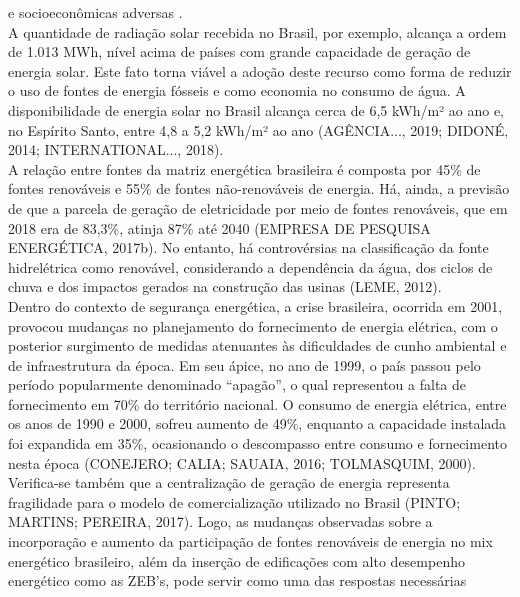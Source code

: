      e socioeconômicas adversas \cite{Pikas2014,Pikas2017}.\\
     A quantidade de radiação solar recebida no Brasil, por exemplo, alcança a ordem de 1.013 MWh, 
     nível acima de países com grande capacidade de geração de energia solar. Este fato 
     torna viável a  adoção  deste  recurso  como  forma  de  reduzir  o  uso  de  fontes  
     de  energia  fósseis  e  como economia  no  consumo  de  água.  A  disponibilidade  de  energia
     solar  no  Brasil  alcança  cerca  de 6,5 kWh/m²  ao  ano  e,  no  Espírito  Santo,  
     entre  4,8  a  5,2 kWh/m²  ao  ano  (AGÊNCIA...,  2019; DIDONÉ, 2014; INTERNATIONAL..., 2018).\\ 
     A relação entre fontes da matriz energética brasileira é composta por 45\% de fontes renováveis
     e 55\% de fontes não-renováveis de energia. Há, ainda, a previsão de que a parcela de geração
     de eletricidade  por  meio  de  fontes  renováveis,  que  em  2018  era  de  83,3\%,  atinja  
     87\%  até  2040 (EMPRESA DE PESQUISA ENERGÉTICA, 2017b). No entanto, há controvérsias na 
     classificação da fonte hidrelétrica como renovável, considerando a dependência da água, 
     dos ciclos de chuva e dos impactos gerados na construção das usinas (LEME, 2012).\\
     Dentro  do  contexto  de  segurança  energética,  a  crise  brasileira,  ocorrida  em  2001,  
     provocou mudanças no planejamento do fornecimento de energia elétrica, com o posterior 
     surgimento de medidas  atenuantes  às dificuldades  de  cunho  ambiental  e  de  infraestrutura  
     da  época.  Em  seu ápice, no ano de 1999, o país passou pelo período popularmente denominado “apagão”, 
     o qual representou  a  falta  de  fornecimento  em  70\%  do  território  nacional.  
     O  consumo  de  energia elétrica, entre os anos de 1990 e 2000, sofreu aumento de 49\%, 
     enquanto a capacidade instalada foi expandida em 35\%, ocasionando o descompasso entre 
     consumo e fornecimento nesta época (CONEJERO; CALIA; SAUAIA, 2016; TOLMASQUIM, 2000).\\ 
     Verifica-se  também  que  a  centralização  de  geração  de  energia  representa  fragilidade  
     para  o modelo  de  comercialização  utilizado  no  Brasil  (PINTO;  MARTINS;  PEREIRA,  2017). 
     Logo,  as mudanças observadas sobre a incorporação e aumento da participação de fontes 
     renováveis de energia  no mix  energético  brasileiro,  além  da  inserção  de  edificações  
     com  alto  desempenho energético como as ZEB’s, pode servir como uma das respostas necessárias 
